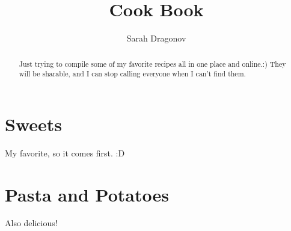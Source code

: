 \documentclass[%
a4paper,
11pt
]{article}
\begin{document}
\title{Cook Book}
\author{Sarah Dragonov}
\maketitle

\begin{abstract}
    \noindent Just trying to compile some of my favorite recipes all in one place and online.:)  They will be sharable, and I can stop calling everyone when I can't find them.
\end{abstract}

\tableofcontents

\vspace{5em}

\section{Sweets}
My favorite, so it comes first.  :D


%











































\section{Pasta and Potatoes}
Also delicious!
\end{document}
